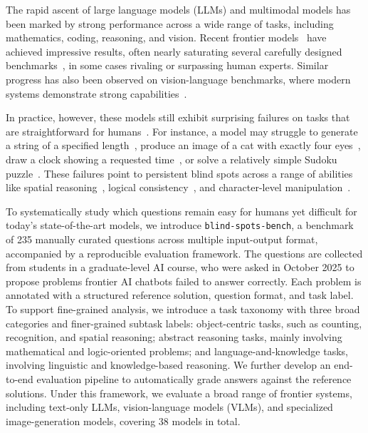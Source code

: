\documentclass{article}
\newcommand{\bench}{\texttt{blind-spots-bench}\xspace}    %
\newcommand{\fb}[1]{{\color{brown} \textbf{Felix: }#1}}
\begin{document}
The rapid ascent of large language models (LLMs) and multimodal models has been marked by strong performance across a wide range of tasks, including mathematics, coding, reasoning, and vision. Recent frontier models~\cite{deepseek2026v4,openai2026gpt55,google2026gemini31} have achieved impressive results, often nearly saturating several carefully designed benchmarks~\cite{ifbench,gpqa_bench,tau_bench,swe_bench,matharena}, in some cases rivaling or surpassing human experts. Similar progress has also been observed on vision-language benchmarks, where modern systems demonstrate strong capabilities~\cite{mathvista,mmbench,mmmu_bench}.

In practice, however, these models still exhibit surprising failures on tasks that are straightforward for humans~\citep{zhou2023instruction,seely2025sudoku,tong2024eyes,fu2024large,chen2026babyvision}. For instance, a model may struggle to generate a string of a specified length~\cite{xiong2025enhancing}, produce an image of a cat with exactly four eyes~\cite{wiedemer2023compositional,binyamin2025make}, draw a clock showing a requested time~\cite{saxena2025lost}, or solve a relatively simple Sudoku puzzle~\cite{constraintbench}. These failures point to persistent blind spots across a range of abilities like spatial reasoning~\cite{spatialab}, logical consistency~\cite{liu2025evaluating}, and character-level manipulation~\cite{xiong2025enhancing}. 

To systematically study which questions remain easy for humans yet difficult for today's state-of-the-art models, we introduce \bench, a benchmark of 235 manually curated questions across multiple input-output format, accompanied by a reproducible evaluation framework. The questions are collected from students in a graduate-level AI course, who were asked in October 2025 to propose problems frontier AI chatbots failed to answer correctly. Each problem is annotated with a structured reference solution, question format, and task label. To support fine-grained analysis, we introduce a task taxonomy with three broad categories and finer-grained subtask labels: object-centric tasks, such as counting, recognition, and spatial reasoning; abstract reasoning tasks, mainly involving mathematical and logic-oriented problems; and language-and-knowledge tasks, involving linguistic and knowledge-based reasoning. We further develop an end-to-end evaluation pipeline to automatically grade answers against the reference solutions. 
Under this framework, we evaluate a broad range of frontier systems, including text-only LLMs, vision-language models (VLMs), and specialized image-generation models, covering 38 models in total. 
\end{document}

